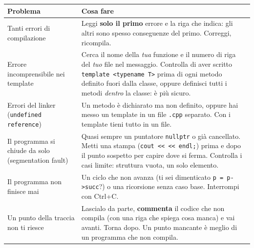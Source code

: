 \begin{center}\small
\begin{tabular}{p{3.6cm}p{9.6cm}}
\toprule
\textbf{Problema} & \textbf{Cosa fare} \\
\midrule
Tanti errori di compilazione & Leggi \textbf{solo il primo} errore e la riga che
indica: gli altri sono spesso conseguenze del primo. Correggi, ricompila. \\
Errore incomprensibile nei template & Cerca il nome della \emph{tua} funzione e il numero
di riga del \emph{tuo} file nel messaggio. Controlla di aver scritto
\texttt{template <typename T>} prima di ogni metodo definito fuori dalla classe, oppure
definisci tutti i metodi \emph{dentro} la classe: è più sicuro. \\
Errori del linker (\texttt{undefined reference}) & Un metodo è dichiarato ma non definito,
oppure hai messo un template in un file \texttt{.cpp} separato. Con i template tieni
tutto in un file. \\
Il programma si chiude da solo (segmentation fault) & Quasi sempre un puntatore
\texttt{nullptr} o già cancellato. Metti una stampa (\texttt{cout << \q{qui 1} << endl;})
prima e dopo il punto sospetto per capire dove si ferma. Controlla i casi limite:
struttura vuota, un solo elemento. \\
Il programma non finisce mai & Un ciclo che non avanza (ti sei dimenticato
\texttt{p = p->succ}?) o una ricorsione senza caso base. Interrompi con Ctrl+C. \\
Un punto della traccia non ti riesce & Lascialo da parte, \textbf{commenta} il codice
che non compila (con una riga che spiega cosa manca) e vai avanti. Torna dopo. Un
punto mancante è meglio di un programma che non compila. \\
\bottomrule
\end{tabular}
\end{center}

